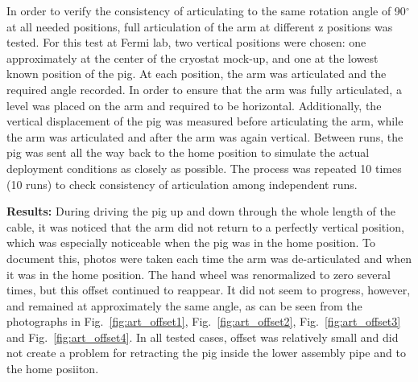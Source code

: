 \begin{itemize}
In order to verify the consistency of articulating to the same rotation angle of 90$^{\circ}$ at all needed positions,  full articulation of the arm at different z positions was tested. For this test at Fermi lab, two vertical positions were chosen: one approximately at the center of the cryostat mock-up, and one at the lowest known position of the pig. At each position, the arm was articulated and
the required angle recorded. In order to ensure that the arm was fully articulated, a level was placed on the
arm and required to be horizontal. Additionally, the vertical displacement of the pig was measured before articulating the arm, while the arm was articulated and after the arm was again vertical. Between runs, the
pig was sent all the way back to the home position to simulate the actual deployment conditions as closely as possible. The process was repeated 10 times  (10 runs) to check consistency of articulation among independent runs.

{\bf Results:} During driving the pig up and down through the whole length of the cable, it was noticed that the arm did not return to a perfectly vertical position, which was especially noticeable when the pig was in the home position. To document this, photos were taken each time the arm was de-articulated and when it was in the home position. The hand wheel was renormalized to zero several times, but this offset continued to reappear. It did not seem to progress, however, and remained at approximately the same angle, as can be seen from the photographs in Fig.~\ref{fig:art_offset1}, Fig.~\ref{fig:art_offset2}, Fig.~\ref{fig:art_offset3} and Fig.~\ref{fig:art_offset4}. In all tested cases, offset was relatively small and did not create a problem for retracting the pig inside the lower assembly pipe and to the home posiiton. 


\end{itemize}

